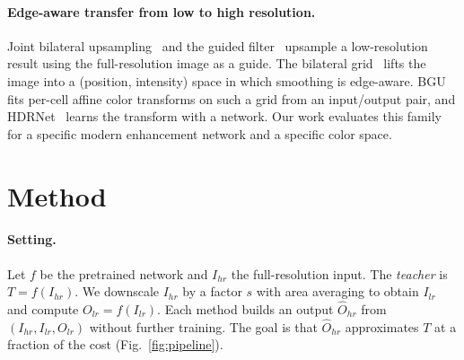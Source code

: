 \documentclass[runningheads]{llncs}
\begin{document}
\paragraph{Edge-aware transfer from low to high resolution.} Joint bilateral upsampling~\cite{jbu} and the guided filter~\cite{guided} upsample a low-resolution result using the full-resolution image as a guide. The bilateral grid~\cite{bilateralgrid} lifts the image into a (position, intensity) space in which smoothing is edge-aware. BGU~\cite{bgu} fits per-cell affine color transforms on such a grid from an input/output pair, and HDRNet~\cite{hdrnet} learns the transform with a network. Our work evaluates this family for a specific modern enhancement network and a specific color space.

\section{Method}
\paragraph{Setting.} Let $f$ be the pretrained network and $I_{hr}$ the full-resolution input. The \emph{teacher} is $T=f(I_{hr})$. We downscale $I_{hr}$ by a factor $s$ with area averaging to obtain $I_{lr}$ and compute $O_{lr}=f(I_{lr})$. Each method builds an output $\hat O_{hr}$ from $(I_{hr},I_{lr},O_{lr})$ without further training. The goal is that $\hat O_{hr}$ approximates $T$ at a fraction of the cost (Fig.~\ref{fig:pipeline}).
\end{document}
